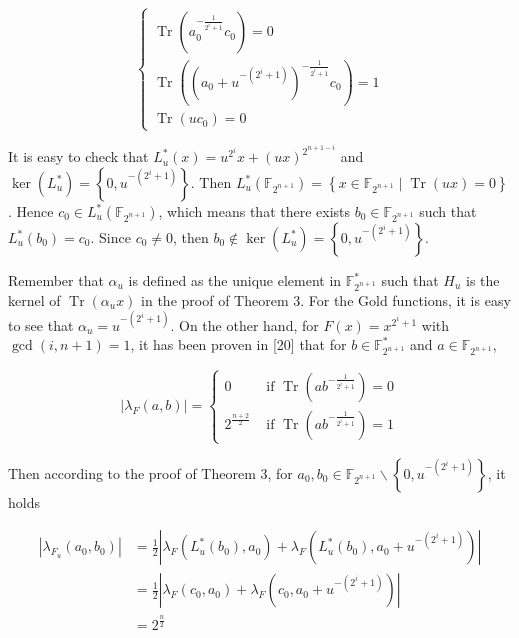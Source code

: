 \documentclass[10pt]{article}
\begin{document}
$$
\left\{\begin{array}{l}
\operatorname{Tr}\left(a_{0}^{-\frac{1}{2^{i}+1}} c_{0}\right)=0 \\
\operatorname{Tr}\left(\left(a_{0}+u^{-\left(2^{i}+1\right)}\right)^{-\frac{1}{2^{i}+1}} c_{0}\right)=1 \\
\operatorname{Tr}\left(u c_{0}\right)=0
\end{array}\right.
$$

It is easy to check that $L_{u}^{*}(x)=u^{2^{i}} x+(u x)^{2^{n+1-i}}$ and $\operatorname{ker}\left(L_{u}^{*}\right)=\left\{0, u^{-\left(2^{i}+1\right)}\right\}$. Then $L_{u}^{*}\left(\mathbb{F}_{2^{n+1}}\right)=\left\{x \in \mathbb{F}_{2^{n+1}} \mid \operatorname{Tr}(u x)=0\right\}$. Hence $c_{0} \in L_{u}^{*}\left(\mathbb{F}_{2^{n+1}}\right)$, which means that there exists $b_{0} \in \mathbb{F}_{2^{n+1}}$ such that $L_{u}^{*}\left(b_{0}\right)=c_{0}$. Since $c_{0} \neq 0$, then $b_{0} \notin \operatorname{ker}\left(L_{u}^{*}\right)=\left\{0, u^{-\left(2^{i}+1\right)}\right\}$.

Remember that $\alpha_{u}$ is defined as the unique element in $\mathbb{F}_{2^{n+1}}^{*}$ such that $H_{u}$ is the kernel of $\operatorname{Tr}\left(\alpha_{u} x\right)$ in the proof of Theorem 3. For the Gold functions, it is easy to see that $\alpha_{u}=u^{-\left(2^{i}+1\right)}$. On the other hand, for $F(x)=x^{2^{i}+1}$ with $\operatorname{gcd}(i, n+1)=1$, it has been proven in [20] that for $b \in \mathbb{F}_{2^{n+1}}^{*}$ and $a \in \mathbb{F}_{2^{n+1}}$,

$$
\left|\lambda_{F}(a, b)\right|= \begin{cases}0 & \text { if } \operatorname{Tr}\left(a b^{-\frac{1}{2^{i}+1}}\right)=0 \\ 2^{\frac{n+2}{2}} & \text { if } \operatorname{Tr}\left(a b^{-\frac{1}{2^{i}+1}}\right)=1\end{cases}
$$

Then according to the proof of Theorem 3, for $a_{0}, b_{0} \in \mathbb{F}_{2^{n+1}} \backslash\left\{0, u^{-\left(2^{i}+1\right)}\right\}$, it holds

$$
\begin{aligned}
\left|\lambda_{F_{u}}\left(a_{0}, b_{0}\right)\right| & =\frac{1}{2}\left|\lambda_{F}\left(L_{u}^{*}\left(b_{0}\right), a_{0}\right)+\lambda_{F}\left(L_{u}^{*}\left(b_{0}\right), a_{0}+u^{-\left(2^{i}+1\right)}\right)\right| \\
& =\frac{1}{2}\left|\lambda_{F}\left(c_{0}, a_{0}\right)+\lambda_{F}\left(c_{0}, a_{0}+u^{-\left(2^{i}+1\right)}\right)\right| \\
& =2^{\frac{n}{2}}
\end{aligned}
$$
\end{document}

